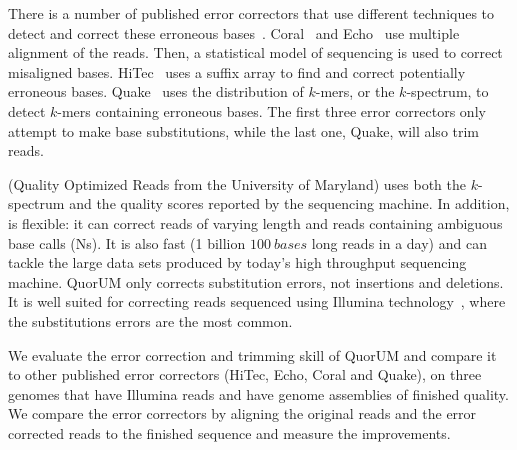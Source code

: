 \documentclass[10pt]{bmc_article}
\newenvironment{bmcformat}{\fussy\setboolean{publ}{true}}{\fussy}
\begin{document}
\begin{bmcformat}

There is a number of published error correctors that use different techniques to detect and correct these erroneous bases~\cite{Yang2012}.
Coral~\cite{salmela2011correcting} and Echo~\cite{Kao2011} use multiple alignment of the reads.
Then, a statistical model of sequencing is used to correct misaligned bases.
HiTec~\cite{Ilie2011b} uses a suffix array to find and correct potentially erroneous bases.
Quake~\cite{Kelley:2010fk} uses the distribution of $k$-mers, or the $k$-spectrum, to detect $k$-mers containing erroneous bases.
The first three error correctors only attempt to make base substitutions, while the last one, Quake, will also trim reads.

\quorum (Quality Optimized Reads from the University of Maryland) uses both the $k$-spectrum and the quality scores reported by the sequencing machine.
In addition, \quorum is flexible: it can correct reads of varying length and reads containing ambiguous base calls (Ns).
It is also fast (1 billion $\SI{100}{bases}$ long reads in a day) and can tackle the large data sets produced by today's high throughput sequencing machine.
QuorUM only corrects substitution errors, not insertions and deletions.
It is well suited for correcting reads sequenced using Illumina technology~\cite{Bentley2008}, where the substitutions errors are the most common.

We evaluate the error correction and trimming skill of QuorUM and compare it to  other published error correctors (HiTec, Echo, Coral and Quake), on  three genomes that have Illumina reads and have genome assemblies of finished quality.
We compare the error correctors by aligning the original reads and the error corrected reads to the finished sequence and measure the improvements.


\end{bmcformat}
\end{document}
